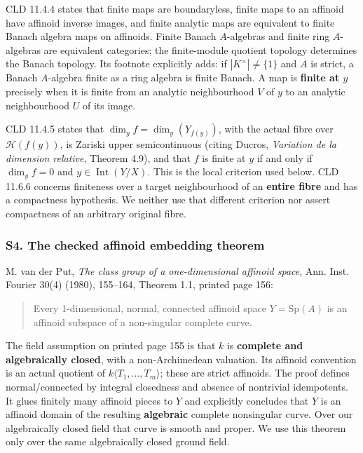 \documentclass[
  11pt,
]{article}
\begin{document}
CLD 11.4.4 states that finite maps are boundaryless, finite maps to an
affinoid have affinoid inverse images, and finite analytic maps are
equivalent to finite Banach algebra maps on affinoids. Finite Banach
\(A\)-algebras and finite ring \(A\)-algebras are equivalent categories;
the finite-module quotient topology determines the Banach topology. Its
footnote explicitly adds: if \(|K^\times|\ne\{1\}\) and \(A\) is strict,
a Banach \(A\)-algebra finite as a ring algebra is finite Banach. A map
is \textbf{finite at \(y\)} precisely when it is finite from an analytic
neighbourhood \(V\) of \(y\) to an analytic neighbourhood \(U\) of its
image.

CLD 11.4.5 states that \(\dim_y f=\dim_y(Y_{f(y)})\), with the actual
fibre over \(\mathcal H(f(y))\), is Zariski upper semicontinuous (citing
Ducros, \emph{Variation de la dimension relative}, Theorem 4.9), and
that \(f\) is finite at \(y\) if and only if \(\dim_y f=0\) and
\(y\in\operatorname{Int}(Y/X)\). This is the local criterion used below.
CLD 11.6.6 concerns finiteness over a target neighbourhood of an
\textbf{entire fibre} and has a compactness hypothesis. We neither use
that different criterion nor assert compactness of an arbitrary original
fibre.

\subsubsection{S4. The checked affinoid embedding
theorem}\label{s4.-the-checked-affinoid-embedding-theorem}

M. van der Put, \emph{The class group of a one-dimensional affinoid
space}, Ann. Inst. Fourier 30(4) (1980), 155--164, Theorem 1.1, printed
page 156:

\begin{quote}
Every 1-dimensional, normal, connected affinoid space
\(Y=\mathrm{Sp}(A)\) is an affinoid subspace of a non-singular complete
curve.
\end{quote}

The field assumption on printed page 155 is that \(k\) is
\textbf{complete and algebraically closed}, with a non-Archimedean
valuation. Its affinoid convention is an actual quotient of
\(k\langle T_1,\ldots,T_m\rangle\); these are strict affinoids. The
proof defines normal/connected by integral closedness and absence of
nontrivial idempotents. It glues finitely many affinoid pieces to \(Y\)
and explicitly concludes that \(Y\) is an affinoid domain of the
resulting \textbf{algebraic} complete nonsingular curve. Over our
algebraically closed field that curve is smooth and proper. We use this
theorem only over the same algebraically closed ground field.
\end{document}
